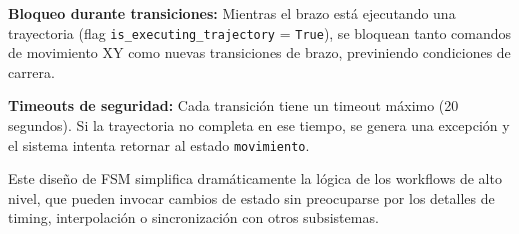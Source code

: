 \textbf{Bloqueo durante transiciones:} Mientras el brazo está ejecutando una trayectoria (flag \texttt{is\_executing\_trajectory} = \texttt{True}), se bloquean tanto comandos de movimiento XY como nuevas transiciones de brazo, previniendo condiciones de carrera.

\textbf{Timeouts de seguridad:} Cada transición tiene un timeout máximo (20 segundos). Si la trayectoria no completa en ese tiempo, se genera una excepción y el sistema intenta retornar al estado \texttt{movimiento}.

Este diseño de FSM simplifica dramáticamente la lógica de los workflows de alto nivel, que pueden invocar cambios de estado sin preocuparse por los detalles de timing, interpolación o sincronización con otros subsistemas.
